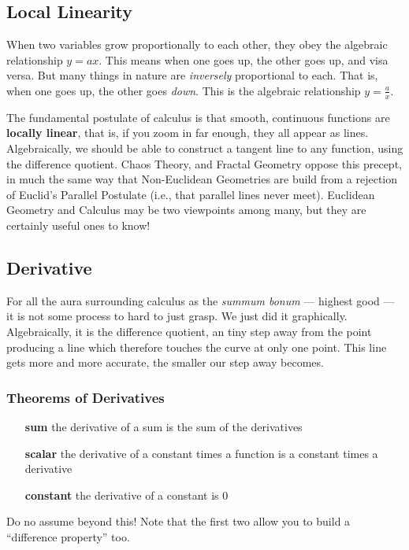 
\subsection{Local Linearity}



When two variables grow proportionally to each other, they obey the algebraic relationship
$y=ax$.  This means when one goes up, the other goes up, and visa versa.  But many things
in nature are \emph{inversely} proportional to each.  
That is, when one goes up, the other goes
\emph{down}.  This is the algebraic relationship $y=\frac{a}{x}$.


The fundamental postulate of calculus is that smooth, continuous functions are \textbf{locally
linear}, that is, if you zoom in far enough, they all appear as lines.  Algebraically, we should be able
to construct a tangent line to any function, using the difference quotient.  Chaos Theory, and
Fractal Geometry oppose this precept, in much the same way that Non-Euclidean Geometries
are build from a rejection of Euclid's Parallel Postulate (i.e., that parallel lines never meet).  Euclidean
Geometry and Calculus may be two viewpoints among many, but they are certainly useful ones to know!

\subsection{Derivative}
For all the aura surrounding calculus as the \textit{summum bonum} --- highest good --- it is not
some process to hard to just grasp.  We just did it graphically.  Algebraically, it is the difference 
quotient, an tiny step away from the point producing a line which therefore touches the
curve at only one point.  This line gets more and more accurate, the smaller our step away becomes.


\subsubsection{Theorems of Derivatives}

\begin{itemize}
\item[\textbf{sum}] the derivative of a sum is the sum of the derivatives 
\item[\textbf{scalar}] the derivative of a constant times a function is a constant times a derivative
\item[\textbf{constant}] the derivative of a constant is 0
\end{itemize}

Do no assume beyond this!  Note that the first two allow you to build a ``difference property'' too.
